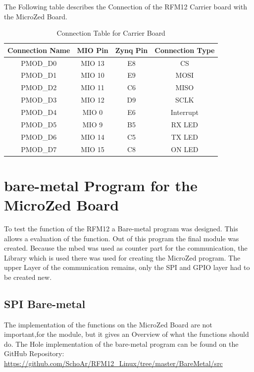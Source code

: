 The Following table describes the Connection of the RFM12 Carrier board with the MicroZed Board.

\begin{table}[H]
    \centering
    \begin{tabular}{ c | c | c |c}\hline                      
        Connection Name & MIO Pin & Zynq Pin & Connection Type  \\ \hline\hline
        PMOD\_D0 & MIO 13 & E8  & CS \\ \hline
        PMOD\_D1 & MIO 10 & E9  & MOSI \\ \hline
				PMOD\_D2 & MIO 11 & C6  & MISO \\ \hline
				PMOD\_D3 & MIO 12 & D9  & SCLK \\ \hline
				PMOD\_D4 & MIO 0  & E6  & Interrupt \\ \hline
				PMOD\_D5 & MIO 9  & B5  & RX LED \\ \hline
				PMOD\_D6 & MIO 14 & C5  & TX LED \\ \hline
				PMOD\_D7 & MIO 15 & C8  & ON LED \\ \hline
				\hline 
        \end{tabular}
    \caption{Connection Table for Carrier Board}
    \label{tab:Connections}
\end{table}


\section{bare-metal Program for the MicroZed Board}
To test the function of the RFM12 a Bare-metal program was designed. This allows a evaluation of the function. Out of this program the final module was created. Because the mbed was used as counter part for the communication, the Library which is used there was used for creating the MicroZed program. The upper Layer of the communication remains, only the SPI and GPIO layer had to be created new.\newline

\subsection{SPI Bare-metal}
The implementation of the functions on the MicroZed Board are not important,for the module, but it gives an Overview of what the functions should do. The Hole implementation of the bare-metal program can be found on the GitHub Repository: \url{https://github.com/SchoAr/RFM12_Linux/tree/master/BareMetal/src}

